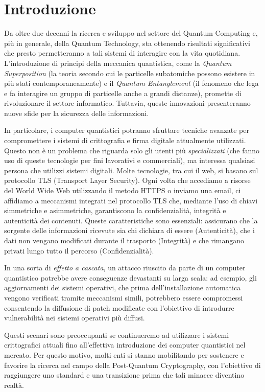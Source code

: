 \chapter{Introduzione}

Da oltre due decenni la ricerca e sviluppo nel settore del Quantum Computing e, più in generale, della Quantum Technology, sta ottenendo risultati significativi che presto permetteranno a tali sistemi di interagire con la vita quotidiana. L'introduzione di principi della meccanica quantistica, come la \textit{Quantum Superposition} (la teoria secondo cui le particelle subatomiche possono esistere in più stati contemporaneamente) e il \textit{Quantum Entanglement} (il fenomeno che lega e fa interagire un gruppo di particelle anche a grandi distanze), promette di rivoluzionare il settore informatico. Tuttavia, queste innovazioni presenteranno nuove sfide per la sicurezza delle informazioni.

In particolare, i computer quantistici potranno sfruttare tecniche avanzate per compromettere i sistemi di crittografia e firma digitale attualmente utilizzati. Questo non è un problema che riguarda solo gli utenti più \textit{specializzati} (che fanno uso di queste tecnologie per fini lavorativi e commerciali), ma interessa qualsiasi persona che utilizzi sistemi digitali. Molte tecnologie, tra cui il web, si basano sul protocollo TLS (Transport Layer Security). Ogni volta che accediamo a risorse del World Wide Web utilizzando il metodo HTTPS o inviamo una email, ci affidiamo a meccanismi integrati nel protocollo TLS che, mediante l'uso di chiavi simmetriche e asimmetriche, garantiscono la confidenzialità, integrità e autenticità dei contenuti. Queste caratteristiche sono essenziali: assicurano che la sorgente delle informazioni ricevute sia chi dichiara di essere (Autenticità), che i dati non vengano modificati durante il trasporto (Integrità) e che rimangano privati lungo tutto il percorso (Confidenzialità).

In una sorta di \textit{effetto a cascata}, un attacco riuscito da parte di un computer quantistico potrebbe avere conseguenze devastanti su larga scala: ad esempio, gli aggiornamenti dei sistemi operativi, che prima dell'installazione automatica vengono verificati tramite meccanismi simili, potrebbero essere compromessi consentendo la diffusione di patch modificate con l'obiettivo di introdurre vulnerabilità nei sistemi operativi più diffusi.

Questi scenari sono preoccupanti se continueremo ad utilizzare i sistemi crittografici attuali fino all'effettiva introduzione dei computer quantistici nel mercato. Per questo motivo, molti enti si stanno mobilitando per sostenere e favorire la ricerca nel campo della Post-Quantum Cryptography, con l'obiettivo di raggiungere uno standard e una transizione prima che tali minacce diventino realtà.

